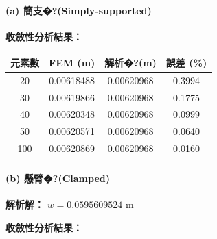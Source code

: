 \documentclass[UTF8, a4paper, 12pt]{ctexart}
\begin{document}
\paragraph{(a) 簡支�?(Simply-supported)}



\textbf{收斂性分析結果：}



\begin{center}

\begin{tabular}{cccc}

\toprule

\textbf{元素數} & \textbf{FEM (m)} & \textbf{解析�?(m)} & \textbf{誤差 (\%)} \\

\midrule

20 & 0.00618488 & 0.00620968 & 0.3994 \\

30 & 0.00619866 & 0.00620968 & 0.1775 \\

40 & 0.00620348 & 0.00620968 & 0.0999 \\

50 & 0.00620571 & 0.00620968 & 0.0640 \\

100 & 0.00620869 & 0.00620968 & 0.0160 \\

\bottomrule

\end{tabular}

\end{center}



\paragraph{(b) 懸臂�?(Clamped)}



\textbf{解析解：} $w = 0.0595609524$ m



\textbf{收斂性分析結果：}
\end{document}
